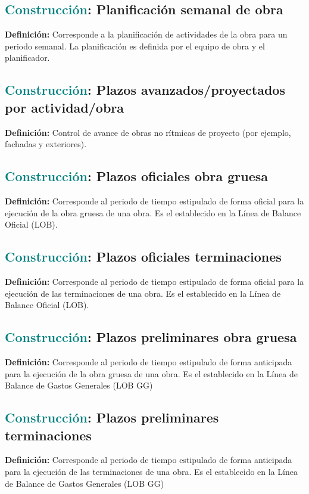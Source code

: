\documentclass[12pt]{article}
\begin{document}
\subsection{\textcolor{teal}{Construcción}: Planificación semanal de obra}
\textbf{Definición:} Corresponde a la planificación de actividades de la obra para un periodo semanal. La planificación es definida por el equipo de obra y el planificador.
\subsection{\textcolor{teal}{Construcción}: Plazos avanzados/proyectados por actividad/obra}
\textbf{Definición:} Control de avance de obras no rítmicas de proyecto (por ejemplo, fachadas y exteriores).
\subsection{\textcolor{teal}{Construcción}: Plazos oficiales obra gruesa}
\textbf{Definición:} Corresponde al periodo de tiempo estipulado de forma oficial para la ejecución de la obra gruesa de una obra. Es el establecido en la Línea de Balance Oficial (LOB).
\subsection{\textcolor{teal}{Construcción}: Plazos oficiales terminaciones}
\textbf{Definición:} Corresponde al periodo de tiempo estipulado de forma oficial para la ejecución de las terminaciones de una obra. Es el establecido en la Línea de Balance Oficial (LOB).
\subsection{\textcolor{teal}{Construcción}: Plazos preliminares obra gruesa}
\textbf{Definición:} Corresponde al periodo de tiempo estipulado de forma anticipada para la ejecución de la obra gruesa de una obra. Es el establecido en la Línea de Balance de Gastos Generales (LOB GG)
\subsection{\textcolor{teal}{Construcción}: Plazos preliminares terminaciones}
\textbf{Definición:} Corresponde al periodo de tiempo estipulado de forma anticipada para la ejecución de las terminaciones de una obra. Es el establecido en la Línea de Balance de Gastos Generales (LOB GG)
\end{document}
